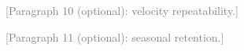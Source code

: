 \documentclass[preprint,12pt,authoryear]{elsarticle}
\newcommand{\towrite}[1]{\textcolor{gray}{[#1]}}
\begin{document}
\towrite{Paragraph 10 (optional): velocity repeatability.}

\towrite{Paragraph 11 (optional): seasonal retention.}
\end{document}
